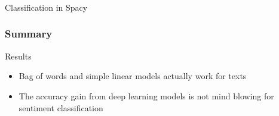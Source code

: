 \begin{frame}[fragile]\frametitle{}

\begin{center}
{\Large Classification in Spacy}
\end{center}
\end{frame}

\begin{frame}[fragile]\frametitle{Summary}
Results

\begin{itemize}
\item Bag of words and simple linear models actually work for 
texts
\item  The accuracy gain from deep learning models is not mind 
blowing for sentiment classification
  \end{itemize}

\end{frame}





